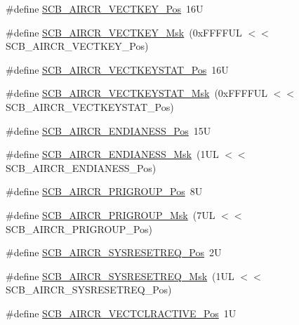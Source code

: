 \begin{DoxyCompactItemize}
\item 
\#define \mbox{\hyperlink{group__CMSIS__SCB_gaaa27c0ba600bf82c3da08c748845b640}{S\+C\+B\+\_\+\+A\+I\+R\+C\+R\+\_\+\+V\+E\+C\+T\+K\+E\+Y\+\_\+\+Pos}}~16U
\item 
\#define \mbox{\hyperlink{group__CMSIS__SCB_ga90c7cf0c490e7ae55f9503a7fda1dd22}{S\+C\+B\+\_\+\+A\+I\+R\+C\+R\+\_\+\+V\+E\+C\+T\+K\+E\+Y\+\_\+\+Msk}}~(0x\+F\+F\+F\+F\+U\+L $<$$<$ S\+C\+B\+\_\+\+A\+I\+R\+C\+R\+\_\+\+V\+E\+C\+T\+K\+E\+Y\+\_\+\+Pos)
\item 
\#define \mbox{\hyperlink{group__CMSIS__SCB_gaec404750ff5ca07f499a3c06b62051ef}{S\+C\+B\+\_\+\+A\+I\+R\+C\+R\+\_\+\+V\+E\+C\+T\+K\+E\+Y\+S\+T\+A\+T\+\_\+\+Pos}}~16U
\item 
\#define \mbox{\hyperlink{group__CMSIS__SCB_gabacedaefeefc73d666bbe59ece904493}{S\+C\+B\+\_\+\+A\+I\+R\+C\+R\+\_\+\+V\+E\+C\+T\+K\+E\+Y\+S\+T\+A\+T\+\_\+\+Msk}}~(0x\+F\+F\+F\+F\+U\+L $<$$<$ S\+C\+B\+\_\+\+A\+I\+R\+C\+R\+\_\+\+V\+E\+C\+T\+K\+E\+Y\+S\+T\+A\+T\+\_\+\+Pos)
\item 
\#define \mbox{\hyperlink{group__CMSIS__SCB_gad31dec98fbc0d33ace63cb1f1a927923}{S\+C\+B\+\_\+\+A\+I\+R\+C\+R\+\_\+\+E\+N\+D\+I\+A\+N\+E\+S\+S\+\_\+\+Pos}}~15U
\item 
\#define \mbox{\hyperlink{group__CMSIS__SCB_ga2f571f93d3d4a6eac9a3040756d3d951}{S\+C\+B\+\_\+\+A\+I\+R\+C\+R\+\_\+\+E\+N\+D\+I\+A\+N\+E\+S\+S\+\_\+\+Msk}}~(1\+U\+L $<$$<$ S\+C\+B\+\_\+\+A\+I\+R\+C\+R\+\_\+\+E\+N\+D\+I\+A\+N\+E\+S\+S\+\_\+\+Pos)
\item 
\#define \mbox{\hyperlink{group__CMSIS__SCB_gaca155deccdeca0f2c76b8100d24196c8}{S\+C\+B\+\_\+\+A\+I\+R\+C\+R\+\_\+\+P\+R\+I\+G\+R\+O\+U\+P\+\_\+\+Pos}}~8U
\item 
\#define \mbox{\hyperlink{group__CMSIS__SCB_ga8be60fff03f48d0d345868060dc6dae7}{S\+C\+B\+\_\+\+A\+I\+R\+C\+R\+\_\+\+P\+R\+I\+G\+R\+O\+U\+P\+\_\+\+Msk}}~(7\+U\+L $<$$<$ S\+C\+B\+\_\+\+A\+I\+R\+C\+R\+\_\+\+P\+R\+I\+G\+R\+O\+U\+P\+\_\+\+Pos)
\item 
\#define \mbox{\hyperlink{group__CMSIS__SCB_gaffb2737eca1eac0fc1c282a76a40953c}{S\+C\+B\+\_\+\+A\+I\+R\+C\+R\+\_\+\+S\+Y\+S\+R\+E\+S\+E\+T\+R\+E\+Q\+\_\+\+Pos}}~2U
\item 
\#define \mbox{\hyperlink{group__CMSIS__SCB_gaae1181119559a5bd36e62afa373fa720}{S\+C\+B\+\_\+\+A\+I\+R\+C\+R\+\_\+\+S\+Y\+S\+R\+E\+S\+E\+T\+R\+E\+Q\+\_\+\+Msk}}~(1\+U\+L $<$$<$ S\+C\+B\+\_\+\+A\+I\+R\+C\+R\+\_\+\+S\+Y\+S\+R\+E\+S\+E\+T\+R\+E\+Q\+\_\+\+Pos)
\item 
\#define \mbox{\hyperlink{group__CMSIS__SCB_gaa30a12e892bb696e61626d71359a9029}{S\+C\+B\+\_\+\+A\+I\+R\+C\+R\+\_\+\+V\+E\+C\+T\+C\+L\+R\+A\+C\+T\+I\+V\+E\+\_\+\+Pos}}~1U
$$
\end{DoxyCompactItemize}
